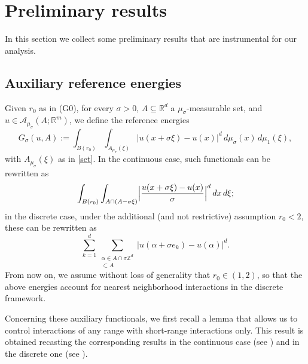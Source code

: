 \documentclass{article}
\theoremstyle{plain}
\theoremstyle{definition}
\def\ZZ{{\mathbb Z}}
\def\ms{\mu_\sigma}
\newcommand{\s}{\sigma}
\newcommand{\A}{\mathcal{A}}
\numberwithin{equation}{section}
\begin{document}
\section{Preliminary results}
\label{Sec: preliminary results}

In this section we collect some preliminary results that are instrumental for our analysis.   

\subsection{Auxiliary reference energies}
Given $r_0$ as in (G0), for every $\s>0$, $A \subseteq \mathbb{R}^{d}$ a $\ms$-measurable set, and $u \in \A_{\ms}(A ;\mathbb{R}^{m})$, we define the reference energies
\begin{equation}\label{Funzionali ausiliari G}
G_\s(u,A):=\int_{B(r_0)}\int_{A_{\ms}(\xi)}
|u(x+\s\xi)-u(x)|^d\,d\ms(x) \, d\mu_1(\xi),
\end{equation}
with $A_{\ms}(\xi)$ as in \eqref{set}. In the continuous case, such functionals can be rewritten as
\begin{equation*}
        \int_{B(r_0)}\int_{A\cap (A-\s\xi)}
\Bigl|\frac{u(x+\s\xi)-u(x)}{\s}\Bigr|^d\,dx \, d\xi;
    \end{equation*}
in the discrete case, under the additional (and not restrictive) assumption $r_0<2$, these can be rewritten as 
\begin{equation*}
    \sum_{k=1}^d \sum_{\substack{\alpha\in A\cap\s\ZZ^d \\ [\alpha,\alpha+\s e_k]\subset A}} |u(\alpha+\s e_k)-u(\alpha)|^d.
\end{equation*}
From now on, we assume without loss of generality that $r_0\in(1,2)$, so that the above energies account for nearest neighborhood interactions in the discrete framework. 

Concerning these auxiliary functionals, we first recall a lemma that allows us to control interactions of any range with short-range interactions only. This result is obtained recasting the corresponding results in the continuous case (see \cite[Lemma 4.1]{AABPT}) and in the discrete one (see \cite[Lemma 3.6]{AliCic}). 
\end{document}
